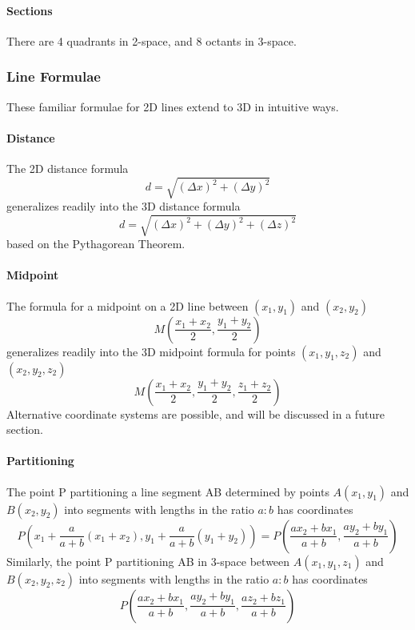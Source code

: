 \documentclass{article}
\begin{document}
\paragraph{Sections}
There are 4 quadrants in 2-space, and 8 octants in 3-space.

\subsubsection{Line Formulae}
These familiar formulae for 2D lines extend to 3D in intuitive ways.

\paragraph{Distance}
The 2D distance formula
$$d = \sqrt{(\Delta x)^2 + (\Delta y)^2}$$
generalizes readily into the 3D distance formula
$$d = \sqrt{(\Delta x)^2 + (\Delta y)^2 + (\Delta z)^2}$$
based on the Pythagorean Theorem.

\paragraph{Midpoint}
The formula for a midpoint on a 2D line between $(x_1, y_1)$ and $(x_2, y_2)$
$$M\left(\frac{x_1+x_2}{2},\frac{y_1+y_2}{2}\right)$$
generalizes readily into the 3D midpoint formula for points $(x_1, y_1, z_2)$ and $(x_2, y_2, z_2)$
$$M\left(\frac{x_1+x_2}{2},\frac{y_1+y_2}{2}, \frac{z_1+z_2}{2}\right)$$
Alternative coordinate systems are possible, and will be discussed in a future section.

\paragraph{Partitioning}
The point P partitioning a line segment AB determined by points $A(x_1,y_1)$ and $B(x_2,y_2)$ into segments with lengths in the ratio $a:b$ has coordinates
$$P\left(x_1+\frac{a}{a+b}\left(x_1+x_2\right), y_1+\frac{a}{a+b}\left(y_1+y_2\right)\right) = P\left(\frac{ax_2 + bx_1}{a+b}, \frac{ay_2 + by_1}{a+b}\right)$$
Similarly, the point P partitioning AB in 3-space between $A(x_1, y_1, z_1)$ and $B(x_2, y_2, z_2)$ into segments with lengths in the ratio $a:b$ has coordinates
$$P\left(\frac{ax_2 + bx_1}{a+b}, \frac{ay_2 + by_1}{a+b}, \frac{az_2 + bz_1}{a+b}\right)$$
\end{document}
